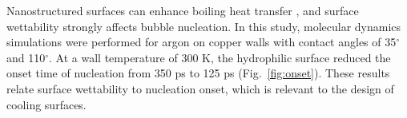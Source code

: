 Nanostructured surfaces can enhance boiling heat transfer \cite{kim2015,chen2019}, and surface wettability strongly affects bubble nucleation. In this study, molecular dynamics simulations were performed for argon on copper walls with contact angles of 35$^\circ$ and 110$^\circ$. At a wall temperature of 300 K, the hydrophilic surface reduced the onset time of nucleation from 350 ps to 125 ps (Fig.~\ref{fig:onset}). These results relate surface wettability to nucleation onset, which is relevant to the design of cooling surfaces.
